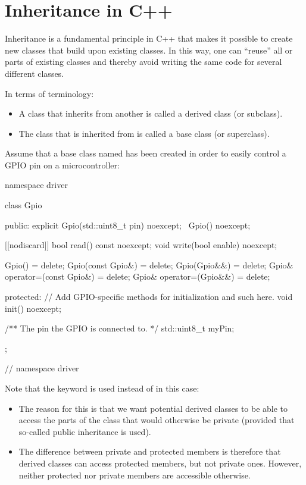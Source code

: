 
\section{Inheritance in C++}
\label{c3:sec:inheritance}\label{c3:app:a}
Inheritance is a fundamental principle in C++ that makes it possible to create new classes that
build upon existing classes. In this way, one can ``reuse'' all or parts of existing classes and
thereby avoid writing the same code for several different classes.

In terms of terminology:
\begin{itemize}
  \item A class that inherits from another is called a derived class (or subclass).
  \item The class that is inherited from is called a base class (or superclass).
\end{itemize}
Assume that a base class named  has been created in order to easily control a
GPIO pin on a microcontroller:

\begin{cppcode}
namespace driver
{
class Gpio
{
public:
    explicit Gpio(std::uint8_t pin) noexcept;
    ~Gpio() noexcept;

    [[nodiscard]] bool read() const noexcept;
    void write(bool enable) noexcept;

    Gpio()                       = delete;
    Gpio(const Gpio&)            = delete;
    Gpio(Gpio&&)                 = delete;
    Gpio& operator=(const Gpio&) = delete;
    Gpio& operator=(Gpio&&)      = delete;

protected:
    // Add GPIO-specific methods for initialization and such here.
    void init() noexcept;

    /** The pin the GPIO is connected to. */
    std::uint8_t myPin;
};
} // namespace driver
\end{cppcode}

\noindent Note that the keyword  is used instead of  in this case:
\begin{itemize}
  \item The reason for this is that we want potential derived classes to be able to access the
    parts of the class that would otherwise be private (provided that so-called public inheritance
    is used).
  \item The difference between private and protected members is therefore that derived classes can
    access protected members, but not private ones. However, neither protected nor private members
    are accessible otherwise.
\end{itemize}

